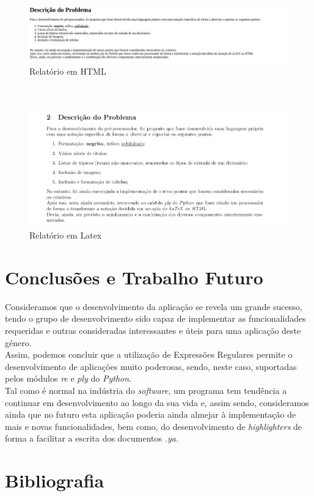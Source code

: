 \documentclass{article}
\begin{document}
\begin{figure}[!ht]
\centering
\includegraphics[width=\textwidth]{images/relatorioHTML.png}
\caption{Relatório em HTML}
\end{figure}
\\
 
\begin{figure}[!ht]
\centering
\includegraphics[width=\textwidth]{images/relatorioTEX.png}
\caption{Relatório em Latex}
\end{figure}
 \clearpage
\section{Conclusões e Trabalho Futuro}
Consideramos que o desenvolvimento da aplicação se revela um grande sucesso, tendo o grupo de desenvolvimento sido capaz de implementar as funcionalidades requeridas e outras consideradas interessantes e úteis para uma aplicação deste género.\\
 Assim, podemos concluir que a utilização de Expressões Regulares permite o desenvolvimento de aplicações muito poderosas, sendo, neste caso, suportadas pelos módulos \textit{re} e \textit{ply} do \textit{Python}.\\
 Tal como é normal na indústria do \textit{software}, um programa tem tendência a continuar em desenvolvimento ao longo da sua vida e, assim sendo, consideramos ainda que no futuro esta aplicação poderia ainda almejar à implementação de mais e novas funcionalidades, bem como, do desenvolvimento de \textit{highlighters} de forma a facilitar a escrita dos documentos \textit{.ya}.\section{Bibliografia}
\end{document}
